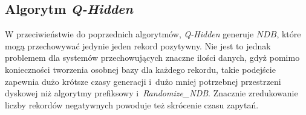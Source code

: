 \subsection{Algorytm \textit{Q-Hidden}} \label{sec:test-q-hidden}
W przeciwieństwie do poprzednich algorytmów, \textit{Q-Hidden} generuje $NDB$, które mogą przechowywać jedynie jeden rekord pozytywny. Nie jest to jednak problemem dla systemów przechowujących znaczne ilości danych, gdyż
pomimo konieczności tworzenia osobnej bazy dla każdego rekordu, takie podejście zapewnia dużo krótsze czasy generacji i~dużo mniej potrzebnej przestrzeni dyskowej niż algorytmy prefiksowy i~\textit{Randomize\_NDB}.
Znacznie zredukowanie liczby rekordów negatywnych powoduje też skrócenie czasu zapytań.

